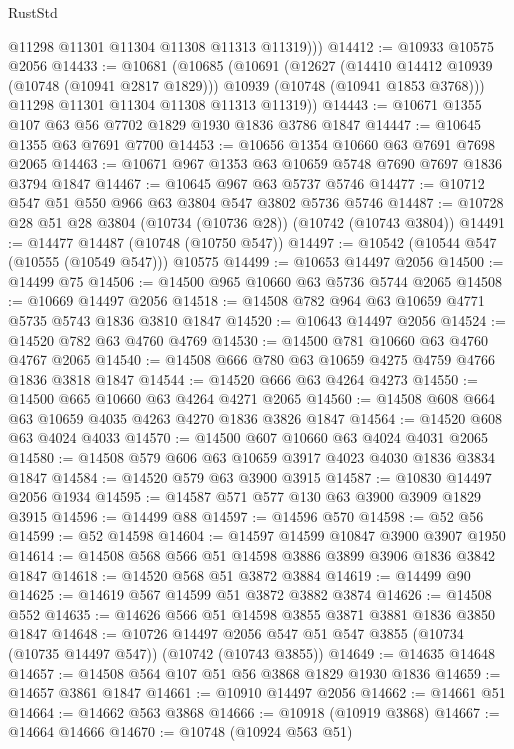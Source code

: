 \begin{lexlean}{RustStd}
\begin{coremodule}
{\begin{coremodule}
{{{{{          @11298
          @11301
          @11304
          @11308
          @11313
          @11319)))
@14412 := @10933 @10575 @2056
@14433 := @10681
    (@10685
      (@10691
        (@12627
          (@14410 @14412 @10939 (@10748 (@10941 @2817 @1829)))
          @10939
          (@10748 (@10941 @1853 @3768)))
        @11298
        @11301
        @11304
        @11308
        @11313
        @11319))
@14443 := @10671 @1355 @107 @63 @56 @7702 @1829 @1930 @1836 @3786 @1847
@14447 := @10645 @1355 @63 @7691 @7700
@14453 := @10656 @1354 @10660 @63 @7691 @7698 @2065
@14463 := @10671 @967 @1353 @63 @10659 @5748 @7690 @7697 @1836 @3794 @1847
@14467 := @10645 @967 @63 @5737 @5746
@14477 := @10712 @547 @51 @550 @966 @63 @3804 @547 @3802 @5736 @5746
@14487 := @10728 @28 @51 @28 @3804 (@10734 (@10736 @28)) (@10742 (@10743 @3804))
@14491 := @14477 @14487 (@10748 (@10750 @547))
@14497 := @10542 (@10544 @547 (@10555 (@10549 @547))) @10575
@14499 := @10653 @14497 @2056
@14500 := @14499 @75
@14506 := @14500 @965 @10660 @63 @5736 @5744 @2065
@14508 := @10669 @14497 @2056
@14518 := @14508 @782 @964 @63 @10659 @4771 @5735 @5743 @1836 @3810 @1847
@14520 := @10643 @14497 @2056
@14524 := @14520 @782 @63 @4760 @4769
@14530 := @14500 @781 @10660 @63 @4760 @4767 @2065
@14540 := @14508 @666 @780 @63 @10659 @4275 @4759 @4766 @1836 @3818 @1847
@14544 := @14520 @666 @63 @4264 @4273
@14550 := @14500 @665 @10660 @63 @4264 @4271 @2065
@14560 := @14508 @608 @664 @63 @10659 @4035 @4263 @4270 @1836 @3826 @1847
@14564 := @14520 @608 @63 @4024 @4033
@14570 := @14500 @607 @10660 @63 @4024 @4031 @2065
@14580 := @14508 @579 @606 @63 @10659 @3917 @4023 @4030 @1836 @3834 @1847
@14584 := @14520 @579 @63 @3900 @3915
@14587 := @10830 @14497 @2056 @1934
@14595 := @14587 @571 @577 @130 @63 @3900 @3909 @1829 @3915
@14596 := @14499 @88
@14597 := @14596 @570
@14598 := @52 @56
@14599 := @52 @14598
@14604 := @14597 @14599 @10847 @3900 @3907 @1950
@14614 := @14508 @568 @566 @51 @14598 @3886 @3899 @3906 @1836 @3842 @1847
@14618 := @14520 @568 @51 @3872 @3884
@14619 := @14499 @90
@14625 := @14619 @567 @14599 @51 @3872 @3882 @3874
@14626 := @14508 @552
@14635 := @14626 @566 @51 @14598 @3855 @3871 @3881 @1836 @3850 @1847
@14648 := @10726
    @14497
    @2056
    @547
    @51
    @547
    @3855
    (@10734 (@10735 @14497 @547))
    (@10742 (@10743 @3855))
@14649 := @14635 @14648
@14657 := @14508 @564 @107 @51 @56 @3868 @1829 @1930 @1836
@14659 := @14657 @3861 @1847
@14661 := @10910 @14497 @2056
@14662 := @14661 @51
@14664 := @14662 @563 @3868
@14666 := @10918 (@10919 @3868)
@14667 := @14664 @14666
@14670 := @10748 (@10924 @563 @51)
}}}}}
\end{coremodule}}
\end{coremodule}
\end{lexlean}
